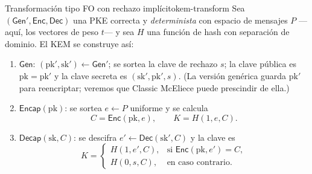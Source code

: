 \documentclass[11pt,a4paper,oneside]{report}
\begin{document}
\begin{definicion}{Transformación tipo FO con rechazo implícito}{kem-transform}
Sea $(\textsf{Gen}',\textsf{Enc},\textsf{Dec})$ una PKE correcta y
\emph{determinista} con espacio de mensajes $P$ ---aquí, los vectores
de peso $t$--- y sea $H$ una función de hash con separación de dominio.
El KEM se construye así:
\begin{enumerate}[leftmargin=1.8em,itemsep=2pt]
  \item $\textsf{Gen}$: $(\mathrm{pk}',\mathrm{sk}')\leftarrow
        \textsf{Gen}'$; se sortea la clave de rechazo $s$; la clave
        pública es $\mathrm{pk}=\mathrm{pk}'$ y la clave secreta es
        $(\mathrm{sk}',\mathrm{pk}',s)$. (La versión genérica guarda
        $\mathrm{pk}'$ para reencriptar; veremos que Classic McEliece
        puede prescindir de ella.)
  \item $\textsf{Encap}(\mathrm{pk})$: se sortea $e\leftarrow P$
        uniforme y se calcula
        \[
          C=\textsf{Enc}(\mathrm{pk},e),
          \qquad
          K=H(1,e,C).
          \label{eq:kem-encap}
        \]
  \item $\textsf{Decap}(\mathrm{sk},C)$: se descifra
        $e'\leftarrow\textsf{Dec}(\mathrm{sk}',C)$ y la clave es
        \[
          K=
          \begin{cases}
            H(1,e',C), & \text{si $\textsf{Enc}(\mathrm{pk},e')=C$},\\[2pt]
            H(0,s,C),  & \text{en caso contrario.}
          \end{cases}
          \label{eq:kem-decap}
        \]
\end{enumerate}
\end{definicion}
\end{document}
